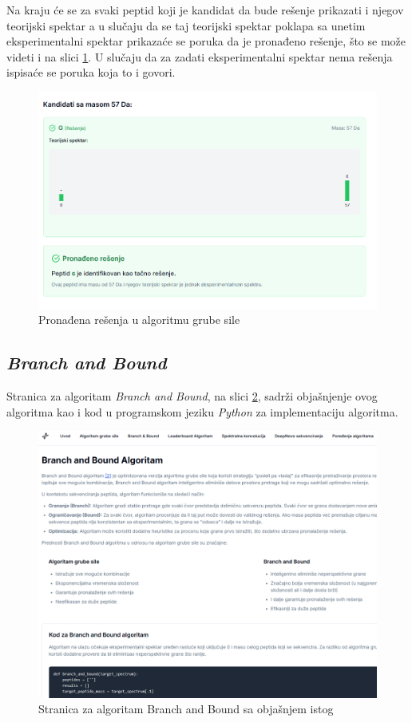 \documentclass[12pt,oneside]{memoir}
\begin{document}
Na kraju će se za svaki peptid koji je kandidat da bude rešenje prikazati i njegov teorijski spektar a u slučaju da se taj teorijski spektar poklapa sa unetim eksperimentalni spektar prikazaće se poruka da je pronađeno rešenje, što se može videti i na slici \ref{fig:brute_force_3}. U slučaju da za zadati eksperimentalni spektar nema rešenja ispisaće se poruka koja to i govori.

\begin{figure}[H]
\centering
\includegraphics[width=1\textwidth]{images/brute_force_3.png}
\caption{Pronađena rešenja u algoritmu grube sile}
\label{fig:brute_force_3}
\end{figure}

\subsection{\emph{Branch and Bound}}
Stranica za algoritam \emph{Branch and Bound}, na slici \ref{fig:branch_and_bound}, sadrži objašnjenje ovog algoritma kao i kod u programskom jeziku \emph{Python} za implementaciju algoritma.
\begin{figure}[h]
\centering
\includegraphics[width=1\textwidth]{images/branch_and_bound.png}
\caption{Stranica za algoritam Branch and Bound sa objašnjem istog}
\label{fig:branch_and_bound}
\end{figure}
\end{document}
